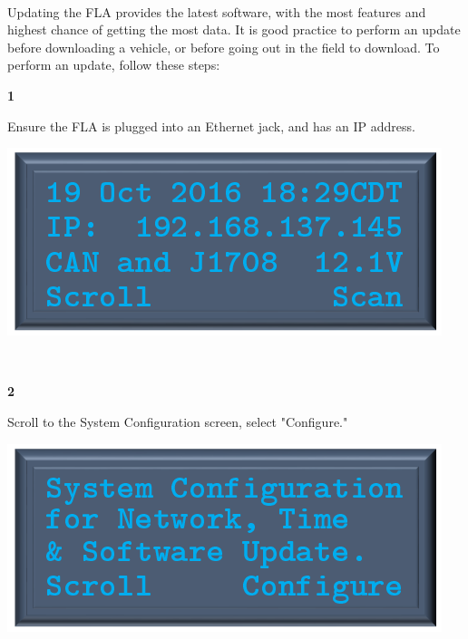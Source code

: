 \documentclass[11pt, oneside]{book}
\begin{document}
\paragraph{  }
Updating the FLA provides the latest software, with the most features
and highest chance of getting the most data. It is good practice to
perform an update before downloading a vehicle, or before going out
in the field to download.
To perform an update, follow these steps:
\\[\baselineskip]
\noindent\begin{minipage}{0.45\textwidth}%
	\begin{center}
		\textbf{1}
	\end{center}
	Ensure the FLA is plugged into an Ethernet jack, and has an IP address.
\end{minipage}%
\hfill%
\begin{minipage}{0.45\textwidth} 
	\includegraphics[width=\linewidth]{../media/pstricks_files/01_main_screen}
\end{minipage}\\[\baselineskip]
\noindent\begin{minipage}{0.45\textwidth}%
	\begin{center}
		\textbf{2}
	\end{center}
	Scroll to the System Configuration screen, select "Configure."
\end{minipage}%
\hfill%
\begin{minipage}{0.45\textwidth} 
	\includegraphics[width=\linewidth]{../media/pstricks_files/06_system_configuration}
\end{minipage}\\[\baselineskip]
\end{document}
